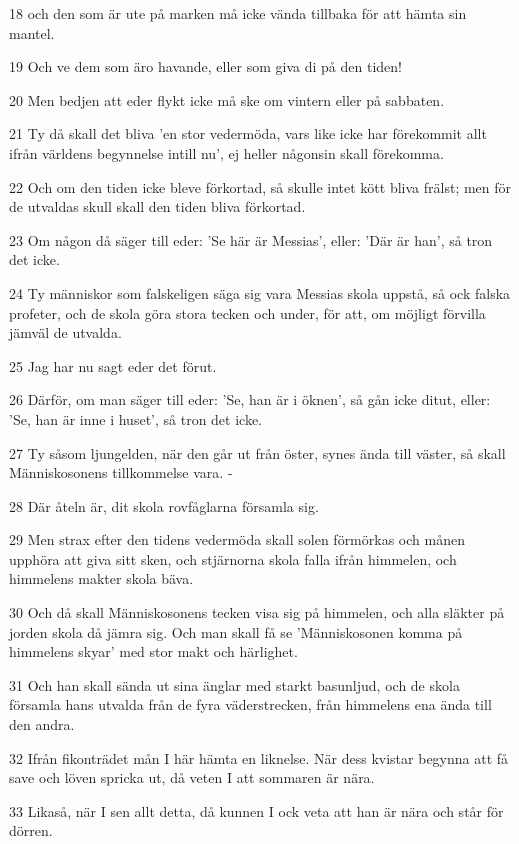 \par 18 och den som är ute på marken må icke vända tillbaka för att hämta sin mantel.
\par 19 Och ve dem som äro havande, eller som giva di på den tiden!
\par 20 Men bedjen att eder flykt icke må ske om vintern eller på sabbaten.
\par 21 Ty då skall det bliva 'en stor vedermöda, vars like icke har förekommit allt ifrån världens begynnelse intill nu', ej heller någonsin skall förekomma.
\par 22 Och om den tiden icke bleve förkortad, så skulle intet kött bliva frälst; men för de utvaldas skull skall den tiden bliva förkortad.
\par 23 Om någon då säger till eder: 'Se här är Messias', eller: 'Där är han', så tron det icke.
\par 24 Ty människor som falskeligen säga sig vara Messias skola uppstå, så ock falska profeter, och de skola göra stora tecken och under, för att, om möjligt förvilla jämväl de utvalda.
\par 25 Jag har nu sagt eder det förut.
\par 26 Därför, om man säger till eder: 'Se, han är i öknen', så gån icke ditut, eller: 'Se, han är inne i huset', så tron det icke.
\par 27 Ty såsom ljungelden, när den går ut från öster, synes ända till väster, så skall Människosonens tillkommelse vara. -
\par 28 Där åteln är, dit skola rovfåglarna församla sig.
\par 29 Men strax efter den tidens vedermöda skall solen förmörkas och månen upphöra att giva sitt sken, och stjärnorna skola falla ifrån himmelen, och himmelens makter skola bäva.
\par 30 Och då skall Människosonens tecken visa sig på himmelen, och alla släkter på jorden skola då jämra sig. Och man skall få se 'Människosonen komma på himmelens skyar' med stor makt och härlighet.
\par 31 Och han skall sända ut sina änglar med starkt basunljud, och de skola församla hans utvalda från de fyra väderstrecken, från himmelens ena ända till den andra.
\par 32 Ifrån fikonträdet mån I här hämta en liknelse. När dess kvistar begynna att få save och löven spricka ut, då veten I att sommaren är nära.
\par 33 Likaså, när I sen allt detta, då kunnen I ock veta att han är nära och står för dörren.
